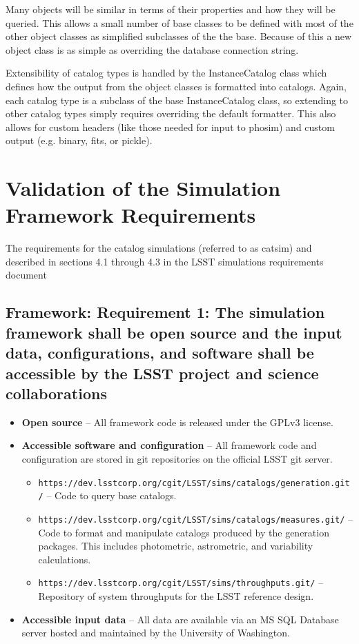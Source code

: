 \documentclass[]{article}
\begin{document}
{Many objects will be similar in terms of their properties and how they will be queried.
This allows a small number of base classes to be defined with most of the other object
classes as simplified subclasses of the the base.
Because of this a new object class is as simple as overriding the database connection string.

Extensibility of catalog types is handled by the InstanceCatalog class which defines how
the output from the object classes is formatted into catalogs.  Again, each catalog
type is a subclass of the base InstanceCatalog class, so extending to other catalog
types simply requires overriding the default formatter.  This also allows for custom headers
(like those needed for input to phosim) and custom output (e.g. binary, fits, or pickle).

\section{Validation of the Simulation Framework Requirements}
The requirements for the catalog simulations (referred to as catsim) and described in sections
4.1 through 4.3 in the LSST simulations requirements document \citep{requirements}

\subsection{Framework: Requirement 1: The simulation framework shall be open source and the input data, configurations,
and software shall be accessible by the LSST project and science collaborations}
\begin{itemize}
\item {\bf Open source} -- All framework code is released under the GPLv3 license.
\item {\bf Accessible software and configuration} -- All framework code and configuration are 
stored in git repositories on the official LSST git server.
\begin{itemize}
\item {\tt https://dev.lsstcorp.org/cgit/LSST/sims/catalogs/generation.git/} -- Code to query
base catalogs.
\item {\tt https://dev.lsstcorp.org/cgit/LSST/sims/catalogs/measures.git/} -- Code to format
and manipulate catalogs produced by the generation packages.  This includes photometric, 
astrometric, and variability calculations.
\item {\tt https://dev.lsstcorp.org/cgit/LSST/sims/throughputs.git/} -- Repository
of system throughputs for the LSST reference design.
\end{itemize}
\item {\bf Accessible input data} -- All data are available via an MS SQL Database server
hosted and maintained by the University of Washington.
\end{itemize}

}
\end{document}
